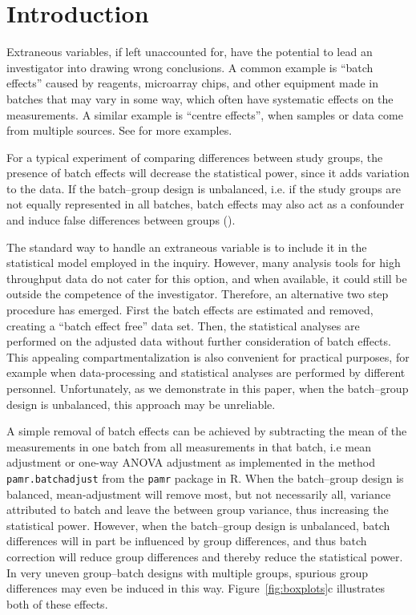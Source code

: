 \documentclass{bio}
\begin{document}
\section{Introduction}\label{intro}

Extraneous variables, if left unaccounted for, have the potential to lead an investigator into drawing wrong conclusions. A common example is ``batch effects'' caused by reagents, microarray chips, and other equipment made in batches that may vary in some way, which often have systematic effects on the measurements. A similar example is ``centre effects'', when samples or data come from multiple sources. See \citet{Luo2010} for more examples.

For a typical experiment of comparing differences between study groups, the presence of batch effects will decrease the statistical power, since it adds variation to the data. If the batch--group design is unbalanced, i.e. if the study groups are not equally represented in all batches, batch effects may also act as a confounder and induce false differences between groups (\citealp{Leek2010}).

The standard way to handle an extraneous variable is to include it in the statistical model employed in the inquiry. However, many analysis tools for high throughput data do not cater for this option, and when available, it could still be outside the competence of the investigator. Therefore, an alternative two step procedure has emerged. First the batch effects are estimated and removed, creating a ``batch effect free'' data set. Then, the statistical analyses are performed on the adjusted data without further consideration of batch effects. This appealing compartmentalization is also convenient for practical purposes, for example when data-processing and statistical analyses are performed by different personnel. Unfortunately, as we demonstrate in this paper, when the batch--group design is unbalanced, this approach may be unreliable.

A simple removal of batch effects can be achieved by subtracting the mean of the measurements in one batch from all measurements in that batch, i.e mean adjustment or one-way ANOVA adjustment as implemented in the method \texttt{pamr.batchadjust} from the \texttt{pamr} package in R. When the batch--group design is balanced, mean-adjustment will remove most, but not necessarily all, variance attributed to batch and leave the between group variance, thus increasing the statistical power. However, when the batch--group design is unbalanced, batch differences will in part be influenced by group differences, and thus batch correction will reduce group differences and thereby reduce the statistical power. In very uneven group--batch designs with multiple groups, spurious group differences may even be induced in this way. Figure~\ref{fig:boxplots}c illustrates both of these effects.
\end{document}
